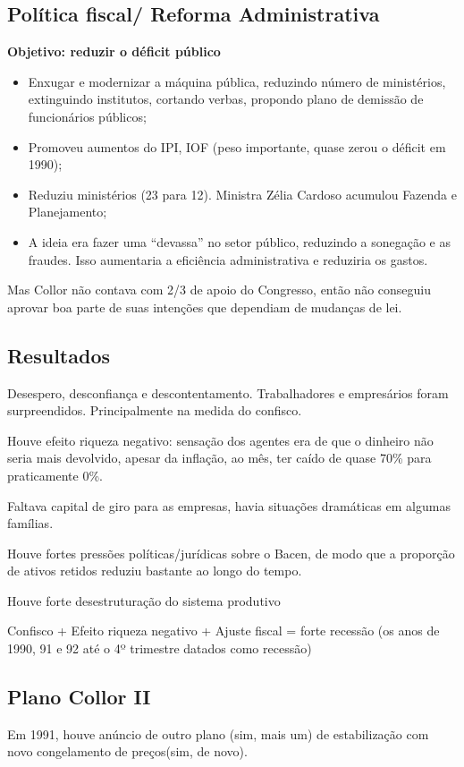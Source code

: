 \documentclass[a4paper,12pt]{article}[abntex2]
\begin{document}
\subsection{\textbf{Política fiscal/ Reforma Administrativa}}
\textbf{Objetivo: reduzir o déficit público}\begin{itemize}
    \item Enxugar e modernizar a máquina pública, reduzindo número de ministérios, extinguindo institutos, cortando verbas, propondo plano de demissão de funcionários públicos;
    \item Promoveu aumentos do IPI, IOF (peso importante, quase zerou o déficit em 1990);
    \item Reduziu ministérios (23 para 12). Ministra Zélia Cardoso acumulou Fazenda e Planejamento;
    \item A ideia era fazer uma “devassa” no setor público, reduzindo a sonegação e as fraudes. Isso aumentaria a eficiência administrativa e reduziria os gastos.
\end{itemize}

Mas Collor não contava com 2/3 de apoio do Congresso, então não conseguiu aprovar boa parte de suas intenções que dependiam de mudanças de lei.

\subsection{\textbf{Resultados}}
Desespero, desconfiança e descontentamento. Trabalhadores e empresários foram surpreendidos. Principalmente na medida do confisco.

Houve efeito riqueza negativo: sensação dos agentes era de que o dinheiro não seria mais devolvido, apesar da inflação, ao mês, ter caído de quase 70\% para praticamente 0\%.

Faltava capital de giro para as empresas, havia situações dramáticas em algumas famílias.

Houve fortes pressões políticas/jurídicas sobre o Bacen, de modo que a proporção de ativos retidos reduziu bastante ao longo do tempo.

Houve forte desestruturação do sistema produtivo

Confisco + Efeito riqueza negativo + Ajuste fiscal = forte recessão (os anos de 1990, 91 e 92 até o 4º trimestre datados como recessão)

\subsection{\textbf{Plano Collor II}}
Em 1991, houve anúncio de outro plano (sim, mais um) de estabilização com novo congelamento de preços(sim, de novo).
\end{document}

